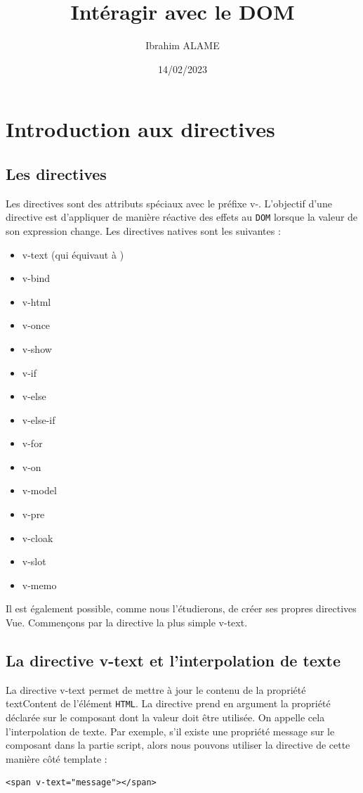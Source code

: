 \documentclass{article}
\title{Intéragir avec le DOM}
\author{Ibrahim ALAME}
\date{14/02/2023}
\begin{document}
\maketitle

\section{Introduction aux directives}
\subsection{Les directives}
Les directives sont des attributs spéciaux avec le préfixe {\color{monOrange}v-}. L'objectif d'une directive est d'appliquer de manière réactive des effets au {\tt DOM} lorsque la valeur de son expression change. Les directives natives sont les suivantes :
\begin{itemize}
\item v-text (qui équivaut à {{ }})
\item v-bind
\item v-html
\item v-once
\item v-show
\item v-if
\item v-else
\item v-else-if
\item v-for
\item v-on
\item v-model
\item v-pre
\item v-cloak
\item v-slot
\item v-memo
\end{itemize}

Il est également possible, comme nous l'étudierons, de créer ses propres directives {\color{monOrange}Vue}. Commençons par la directive la plus simple v-text.

\subsection{La directive {\color{monOrange}v-text} et l'interpolation de texte}
La directive {\color{monOrange}v-text} permet de mettre à jour le contenu de la propriété textContent de l'élément {\tt HTML}. La directive prend en argument la propriété déclarée sur le composant dont la valeur doit être utilisée. On appelle cela l'interpolation de texte. Par exemple, s'il existe une propriété message sur le composant dans la partie script, alors nous pouvons utiliser la directive de cette manière côté template :
\begin{verbatim}
<span v-text="message"></span>
\end{verbatim}
\end{document}
